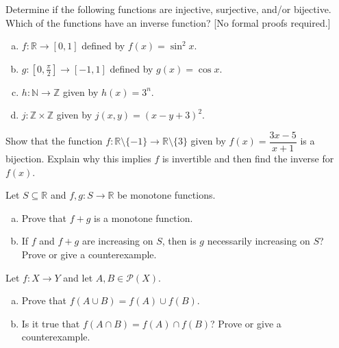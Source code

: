 \documentclass[11pt,letterpaper]{article}
\begin{document}
\homework{}

 Determine if the following functions are injective, surjective, and/or bijective. Which of the functions have an inverse function? [No formal proofs required.]
\begin{enumerate}[(a)]
\item $f: \mathbb{R} \to [0,1]$ defined by $f(x)= \sin^2 x$.
\item $g: [0, \frac{\pi}{2}] \to [-1, 1]$ defined by $g(x)= \cos x$.
\item $h: \mathbb{N} \to \mathbb{Z}$ given by $h(x)= 3^n$.
\item $j: \mathbb{Z} \times \mathbb{Z}$ given by $j(x,y)= (x - y + 3)^2$.
\end{enumerate}





\newpage





 Show that the function $f: \mathbb{R} \setminus \{ -1 \} \to \mathbb{R} \setminus \{ 3 \}$ given by $f(x)= \dfrac{3x - 5}{x + 1}$ is a bijection. Explain why this implies $f$ is invertible and then find the inverse for $f(x)$. 





\newpage





 Let $S \subseteq \mathbb{R}$ and $f, g: S \to \mathbb{R}$ be monotone functions. 
\begin{enumerate}[(a)]
\item Prove that $f + g$ is a monotone function. 
\item If $f$ and $f + g$ are increasing on $S$, then is $g$ necessarily increasing on $S$? Prove or give a counterexample. 
\end{enumerate}





\newpage





 Let $f: X \to Y$ and let $A, B \in \mathcal{P}(X)$. 
\begin{enumerate}[(a)]
\item Prove that $f(A \cup B)= f(A) \cup f(B)$. 
\item Is it true that $f(A \cap B)= f(A) \cap f(B)$? Prove or give a counterexample. 
\end{enumerate}
\end{document}
